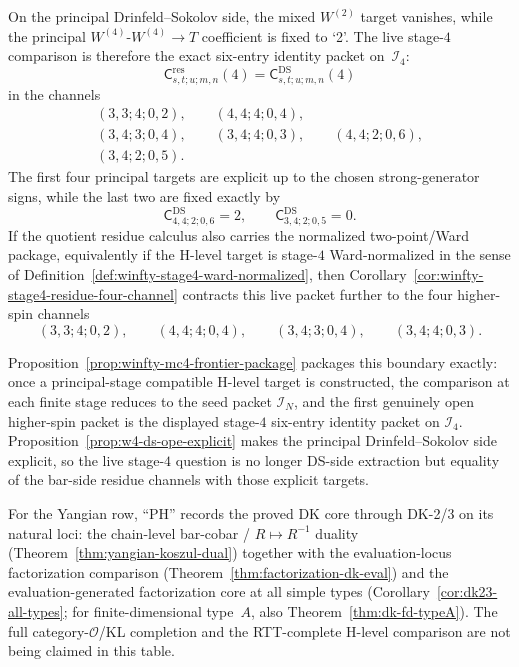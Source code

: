 On the principal Drinfeld--Sokolov side, the mixed $W^{(2)}$ target
vanishes, while the principal $W^{(4)}$-$W^{(4)}\to T$ coefficient is
fixed to `2'.  The live stage-$4$ comparison is therefore the exact
six-entry identity packet on~$\mathcal{I}_4$:
\[
\mathsf{C}^{\mathrm{res}}_{s,t;u;m,n}(4)
=
\mathsf{C}^{\mathrm{DS}}_{s,t;u;m,n}(4)
\]
in the channels
\[
\begin{gathered}
(3,3;4;0,2),\qquad
(4,4;4;0,4),\\
(3,4;3;0,4),\qquad
(3,4;4;0,3),\qquad
(4,4;2;0,6),\\
(3,4;2;0,5).
\end{gathered}
\]
The first four principal targets are explicit up to the chosen
strong-generator signs, while the last two are fixed exactly by
\[
\mathsf{C}^{\mathrm{DS}}_{4,4;2;0,6}=2,
\qquad
\mathsf{C}^{\mathrm{DS}}_{3,4;2;0,5}=0.
\]
If the quotient residue calculus also carries the normalized
two-point/Ward package, equivalently if the H-level target is
stage-$4$ Ward-normalized in the sense of
Definition~\ref{def:winfty-stage4-ward-normalized}, then
Corollary~\ref{cor:winfty-stage4-residue-four-channel} contracts this
live packet further to the four higher-spin channels
\[
(3,3;4;0,2),\qquad
(4,4;4;0,4),\qquad
(3,4;3;0,4),\qquad
(3,4;4;0,3).
\]

Proposition~\ref{prop:winfty-mc4-frontier-package} packages this
boundary exactly: once a principal-stage compatible H-level target is
constructed, the comparison at each finite stage reduces to the seed
packet $\mathcal{I}_N$, and the first genuinely open higher-spin packet
is the displayed stage-$4$ six-entry identity packet on
$\mathcal{I}_4$.  Proposition~\ref{prop:w4-ds-ope-explicit} makes the
principal Drinfeld--Sokolov side explicit, so the live stage-$4$
question is no longer DS-side extraction but equality of the bar-side
residue channels with those explicit targets.

For the Yangian row, ``PH'' records the proved DK core through DK-2/3
on its natural loci: the chain-level bar-cobar / $R \mapsto R^{-1}$
duality
\textup{(}Theorem~\ref{thm:yangian-koszul-dual}\textup{)} together with
the evaluation-locus factorization comparison
\textup{(}Theorem~\ref{thm:factorization-dk-eval}\textup{)} and the
evaluation-generated factorization core at all simple types
\textup{(}Corollary~\ref{cor:dk23-all-types}; for finite-dimensional
type~$A$, also Theorem~\ref{thm:dk-fd-typeA}\textup{)}.  The full
category-$\mathcal{O}$/KL completion and the RTT-complete H-level
comparison are not being claimed in this table.

